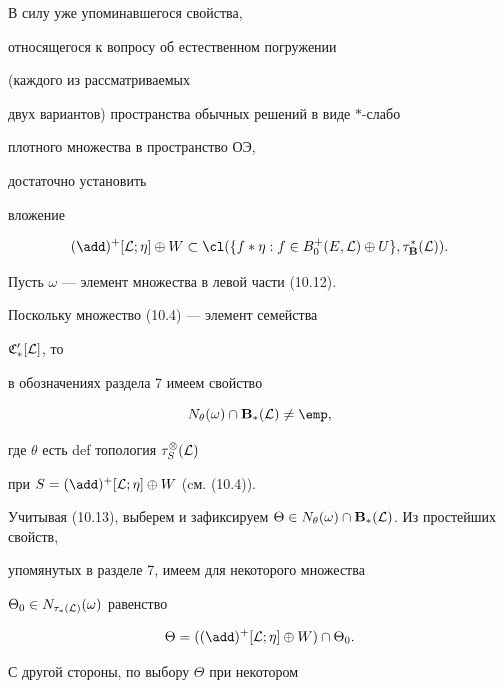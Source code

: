 \begin{pf}


В силу уже упоминавшегося свойства,


относящегося к вопросу об естественном погружении


(каждого из рассматриваемых


двух вариантов) пространства обычных решений в виде $*$-слабо


плотного множества в пространство ОЭ,


достаточно установить


вложение


\begin{equation}


{(\add)^+}[{\cal L};\eta] \oplus W \subset {\cl}(\{{f*\eta}:


f \in {B_0^+}(E,{\cal L}) \oplus U\},{{\tau}_{\bold B}^*}({\cal L})).


\end{equation}





Пусть $\omega$ --- элемент множества в левой части (10.12).


Поскольку множество (10.4) --- элемент семейства


${{\frak C}'_*}[{\cal L}]$, то


в обозначениях раздела 7 имеем свойство


\begin{equation}


{N_\theta}(\omega) \cap {{\bold B}_*}({\cal L}) \ne \emp,


\end{equation}


где $\theta$ есть def топология ${{\tau}_S^\otimes}({\cal L})$


при $S = {(\add)^+}[{\cal L};\eta] \oplus W$ (cм. (10.4)).


Учитывая (10.13), выберем и зафиксируем $\Theta \in {N_\theta}(\omega) \cap


{{\bold B}_*}({\cal L})$. Из простейших свойств,


упомянутых в разделе 7, имеем для некоторого множества


${{\Theta}_0} \in {N_{{\tau_*}({\cal L})}}(\omega)$ равенство


$$


\Theta = ({(\add)^+}[{\cal L};\eta] \oplus W) \cap {{\Theta}_0}.


$$


С другой стороны, по выбору $\Theta$ при некотором



\end{pf}
